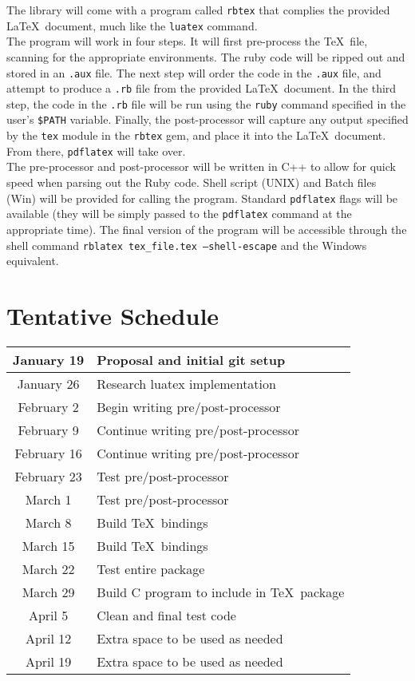 \documentclass{article}
\newcommand{\inlinecode}[1]{\texttt{#1}}
\begin{document}
The library will come with a program called \inlinecode{rbtex} that complies the provided \LaTeX\
document, much like the \inlinecode{luatex} command.\\

The program will work in four steps. It will first pre-process the \TeX\ file, scanning for the
appropriate environments. The ruby code will be ripped out and stored in an \inlinecode{.aux} file.
The next step will order the code in the \inlinecode{.aux} file, and attempt to produce a
\inlinecode{.rb} file from the provided \LaTeX\ document. In the third step, the code in the
\inlinecode{.rb} file will be run using the \inlinecode{ruby} command specified in the user's
\inlinecode{\$PATH} variable. Finally, the post-processor will capture any output specified by the
\inlinecode{tex} module in the \inlinecode{rbtex} gem, and place it into the \LaTeX\ document. From
there, \inlinecode{pdflatex} will take over.\\

The pre-processor and post-processor will be written in C++ to allow for quick speed when parsing
out the Ruby code. Shell script (UNIX) and Batch files (Win) will be provided for calling the
program. Standard \inlinecode{pdflatex} flags will be available (they will be simply passed to the
\inlinecode{pdflatex} command at the appropriate time). The final version of the program will be
accessible through the shell command \inlinecode{rblatex tex\_file.tex --shell-escape} and the Windows
equivalent.

\section{Tentative Schedule}
\begin{center}
\begin{tabular}{| c | l |}
\hline
January 19 & Proposal and initial git setup\\
\hline
January 26 & Research luatex implementation\\
\hline
February 2 & Begin writing pre/post-processor\\
\hline
February 9 & Continue writing pre/post-processor\\
\hline
February 16 & Continue writing pre/post-processor\\
\hline
February 23 & Test pre/post-processor\\
\hline
March 1 & Test pre/post-processor\\
\hline
March 8 & Build \TeX\ bindings\\
\hline
March 15 & Build \TeX\ bindings\\
\hline
March 22 & Test entire package\\
\hline
March 29 & Build C program to include in \TeX\ package\\
\hline
April 5 & Clean and final test code\\
\hline
April 12 & Extra space to be used as needed\\
\hline
April 19 & Extra space to be used as needed\\
\hline
\end{tabular}
\end{center}
\end{document}
